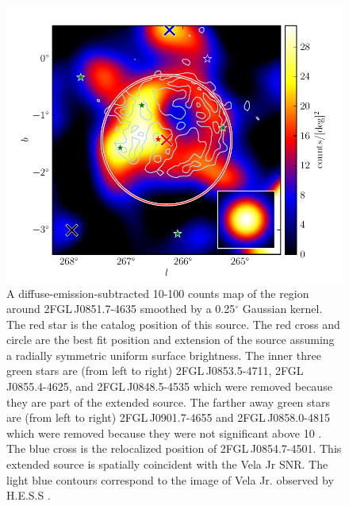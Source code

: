 \documentclass[12pt,preprint]{aastex}
\newcommand{\gev}{\text{GeV}\xspace}
\newcommand{\tev}{\text{TeV}\xspace}
\renewcommand{\deg}{\ensuremath{^\circ}\xspace}
\begin{document}
\begin{figure}
  \begin{center}
    \includegraphics[type=pdf,ext=.pdf,read=.pdf]{source_plots/source_Vela_Jr}
  \end{center}
  \caption{A diffuse-emission-subtracted 10-100
  \gev counts map of the region around 2FGL\,J0851.7-4635 smoothed
  by a 0.25\deg Gaussian kernel. The red star is the catalog position of this source.  The red cross
  and circle are the best fit position and extension of the source
  assuming a radially
  symmetric uniform surface brightness.  The inner three green stars
  are (from left to right) 2FGL\,J0853.5-4711, 2FGL\,J0855.4-4625,
  and 2FGL\,J0848.5-4535 which were removed because they are part of
  the extended source.  The farther away green stars are (from left to
  right) 2FGL\,J0901.7-4655 and 2FGL\,J0858.0-4815 which were removed
  because they were not significant above 10 \gev.  The blue cross
  is the relocalized position of 2FGL\,J0854.7-4501.  This extended
  source is spatially coincident with the Vela Jr SNR.  The light
  blue contours correspond to the \tev image of Vela Jr. observed by H.E.S.S
  \citep{vela_jr_hess}.
  }\label{Vela_Jr}
\end{figure}
\end{document}
